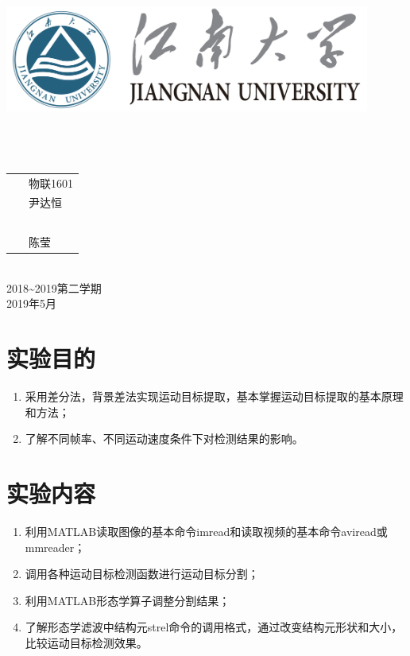 \documentclass[a4paper]{ctexart}
\begin{document}
\begin{titlepage}
	\begin{center}
		\includegraphics[width=0.9\textwidth]{figure//Njust.png}\\
		\vspace{10mm}
		\textbf{}\\[0.8cm]
		\textbf{}\\[3cm]
		\textbf{}\\[3cm]
		\vspace{\fill}
		\setlength{\extrarowheight}{3mm}
		{\songti{}
			\begin{tabular}{rl}
				{\makebox[4\ccwd][s]{班\qquad 级：}} & ~\kaishu 物联1601   \\
				{\makebox[4\ccwd][s]{姓\qquad 名：}} & ~\kaishu 尹达恒     \\
				{\makebox[4\ccwd][s]{学\qquad 号：}} & ~\kaishu 1030616134 \\
				{\makebox[4\ccwd][s]{指导老师：}}    & ~\kaishu 陈莹       \\
			\end{tabular}
		}\\[2cm]
		\vspace{\fill}
		2018\textasciitilde 2019第二学期\\
		2019年5月
	\end{center}
\end{titlepage}

\renewcommand{\baselinestretch}{1.3}
\section{实验目的}
\begin{enumerate}[label=\arabic*、]
	\item 采用差分法，背景差法实现运动目标提取，基本掌握运动目标提取的基本原理和方法；
	\item 了解不同帧率、不同运动速度条件下对检测结果的影响。
\end{enumerate}

\section{实验内容}
\begin{enumerate}[label=\arabic*、]
	\item 利用MATLAB读取图像的基本命令imread和读取视频的基本命令aviread或mmreader；
	\item 调用各种运动目标检测函数进行运动目标分割；
	\item 利用MATLAB形态学算子调整分割结果；
	\item 了解形态学滤波中结构元strel命令的调用格式，通过改变结构元形状和大小，比较运动目标检测效果。
\end{enumerate}
\end{document}
